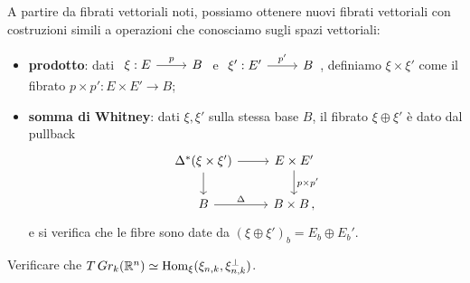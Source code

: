 A partire da fibrati vettoriali noti,
possiamo ottenere nuovi fibrati vettoriali con costruzioni
simili a operazioni che conosciamo sugli spazi vettoriali:
\begin{itemize}
	\item \textbf{prodotto}: dati
	$\begin{tikzcd}
		\xi : E \ar[r, "p"] & B
	\end{tikzcd}$ e 
	$\begin{tikzcd}
		\xi' : E' \ar[r, "p'"] & B
	\end{tikzcd}$,
	definiamo $\xi \times \xi'$ come il fibrato $p \times p' : E \times E' \to B$;
	
	\item \textbf{somma di Whitney}: dati $\xi,\xi'$ sulla stessa base $B$,
	il fibrato $\xi \oplus \xi'$
	è dato dal pullback
	\begin{equation*}
		\begin{tikzcd}
			\Delta^{*}(\xi \times \xi') \ar[r] \ar[d]
			& E \times E' \ar[d, "p \times p'"] \\
			B \ar[r, "\Delta"] & B \times B\,,
		\end{tikzcd}
	\end{equation*}
	e si verifica che le fibre sono date da $\left( \xi \oplus \xi' \right)_{b} = E_{b} \oplus E_{b}'$.
\end{itemize}

\begin{exercise}
	Verificare che $T\,Gr_{k}({\mathbb R}^{n}) \simeq \operatorname{Hom}_{\xi}(\xi_{n,k},\xi_{n,k}^{\perp})$.
\end{exercise}



